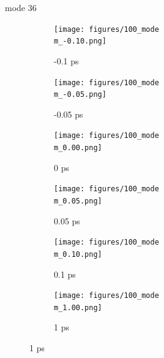 \documentclass{beamer}
\newcommand\w{0.32}
\begin{document}
\renewcommand\m{36}
\begin{frame}{mode \m}
	\begin{figure}
		\centering
		\begin{subfigure}[b]{\w\textwidth}
			\centering
			\texttt{[image: figures/100\_mode\\m\_-0.10.png]}
			\caption{-0.1 ps}
		\end{subfigure}
		\begin{subfigure}[b]{\w\textwidth}
			\centering
			\texttt{[image: figures/100\_mode\\m\_-0.05.png]}
			\caption{-0.05 ps}
		\end{subfigure}
		\begin{subfigure}[b]{\w\textwidth}
			\centering
			\texttt{[image: figures/100\_mode\\m\_0.00.png]}
			\caption{0 ps}
		\end{subfigure}
		\begin{subfigure}[b]{\w\textwidth}
			\centering
			\texttt{[image: figures/100\_mode\\m\_0.05.png]}
			\caption{0.05 ps}
		\end{subfigure}
		\begin{subfigure}[b]{\w\textwidth}
			\centering
			\texttt{[image: figures/100\_mode\\m\_0.10.png]}
			\caption{0.1 ps}
		\end{subfigure}
		\begin{subfigure}[b]{\w\textwidth}
			\centering
			\texttt{[image: figures/100\_mode\\m\_1.00.png]}
			\caption{1 ps}
		\end{subfigure}
	\end{figure}
\end{frame}
\end{document}
